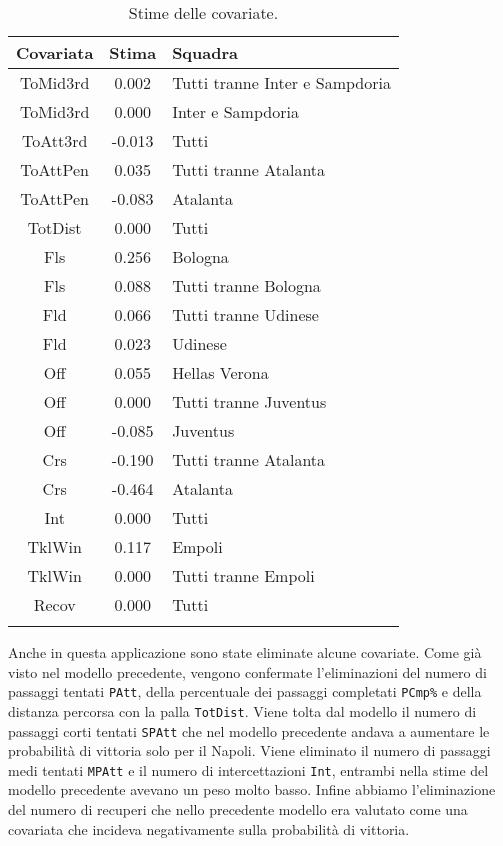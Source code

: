 \begin{table}[]%
	
	\renewcommand{\arraystretch}{1.7}
	\centering
	\begin{tabular}{ccp{10cm}}
		\hline	
		
		\textbf{Covariata} & \textbf{Stima} & \textbf{Squadra} \\	
		\hline
		ToMid3rd & 0.002 & Tutti tranne Inter e Sampdoria\\
		ToMid3rd & 0.000 & Inter e Sampdoria\\
		ToAtt3rd & -0.013 & Tutti \\  
		ToAttPen & 0.035 & Tutti tranne Atalanta \\    
		ToAttPen & -0.083 & Atalanta \\ 	     	 
		TotDist & 0.000 & Tutti \\	
		Fls & 0.256 & Bologna  \\
		Fls & 0.088 & Tutti tranne Bologna \\ 		
		Fld & 0.066 & Tutti tranne Udinese \\
		Fld & 0.023 & Udinese \\
		Off & 0.055 & Hellas Verona\\
		Off & 0.000 & Tutti tranne Juventus\\
		Off & -0.085 & Juventus  \\
		Crs & -0.190 & Tutti tranne Atalanta\\
		Crs & -0.464 & Atalanta \\
		Int & 0.000 & Tutti\\
		TklWin &  0.117 & Empoli  \\
		TklWin &  0.000 & Tutti tranne Empoli  \\ 
		Recov &  0.000 & Tutti \\ 
		\hline
		& &  \\
		
	\end{tabular} \hbox{}
	\caption{Stime delle covariate.} \label{tab:BTCLI3} 
	
\end{table}
Anche in questa applicazione sono state eliminate alcune covariate. Come già visto nel modello precedente, vengono confermate l'eliminazioni del numero di passaggi tentati \texttt{PAtt}, della percentuale dei passaggi completati \texttt{PCmp\%} e della distanza percorsa con la palla \texttt{TotDist}. Viene tolta dal modello il numero di passaggi corti tentati \texttt{SPAtt} che nel modello precedente andava a aumentare le probabilità di vittoria solo per il Napoli. Viene eliminato il numero di passaggi medi tentati \texttt{MPAtt} e il numero di intercettazioni \texttt{Int}, entrambi nella stime del modello precedente avevano un peso molto basso. Infine abbiamo l'eliminazione del numero di recuperi che nello precedente modello era valutato come una covariata che incideva negativamente sulla probabilità di vittoria.\\

